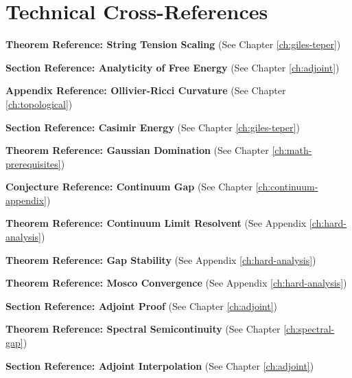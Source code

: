 \chapter{Technical Cross-References}
\label{app:reference-corrections}


\textbf{Theorem Reference: String Tension Scaling} (See Chapter \ref{ch:giles-teper})

\label{sec:analyticity-free-energy}
\textbf{Section Reference: Analyticity of Free Energy} (See Chapter \ref{ch:adjoint})

\label{app:ollivier-ricci}
\textbf{Appendix Reference: Ollivier-Ricci Curvature} (See Chapter \ref{ch:topological})

\label{sec:casimir-energy}
\textbf{Section Reference: Casimir Energy} (See Chapter \ref{ch:giles-teper})

\label{thm:gaussian-domination}
\textbf{Theorem Reference: Gaussian Domination} (See Chapter \ref{ch:math-prerequisites})

\label{conj:continuum-gap}
\textbf{Conjecture Reference: Continuum Gap} (See Chapter \ref{ch:continuum-appendix})

\label{thm:continuum_limit_resolvent}
\textbf{Theorem Reference: Continuum Limit Resolvent} (See Appendix \ref{ch:hard-analysis})

\label{thm:gap_stability}
\textbf{Theorem Reference: Gap Stability} (See Appendix \ref{ch:hard-analysis})

\label{thm:mosco_convergence}
\textbf{Theorem Reference: Mosco Convergence} (See Appendix \ref{ch:hard-analysis})

\label{sec:adjoint-proof}
\textbf{Section Reference: Adjoint Proof} (See Chapter \ref{ch:adjoint})

\label{thm:spectral-semicontinuity}
\textbf{Theorem Reference: Spectral Semicontinuity} (See Chapter \ref{ch:spectral-gap})

\label{sec:adjoint-interpolation}
\textbf{Section Reference: Adjoint Interpolation} (See Chapter \ref{ch:adjoint})

